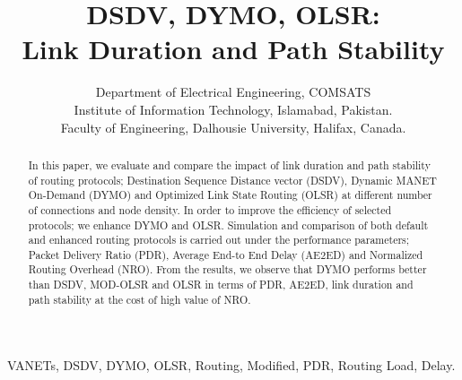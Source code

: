 \documentclass[journal]{IEEEtran}
\begin{document}
\title{DSDV, DYMO, OLSR:\\ Link Duration and Path Stability}


\author{
                Department of Electrical Engineering, COMSATS\\ Institute of
                Information Technology, Islamabad, Pakistan. \\
                Faculty of Engineering, Dalhousie University, Halifax, Canada.
             }



\maketitle

\begin{abstract}
In this paper, we evaluate and compare the impact of link duration and path stability of routing protocols; Destination Sequence Distance vector (DSDV), Dynamic MANET On-Demand (DYMO) and Optimized Link State Routing (OLSR) at different number of connections and node density. In order to improve the efficiency of selected protocols; we enhance DYMO and OLSR. Simulation and comparison of both default and enhanced routing protocols is carried out under the performance parameters; Packet Delivery Ratio (PDR), Average End-to End Delay (AE2ED) and Normalized Routing Overhead (NRO). From the results, we observe that DYMO performs better than DSDV, MOD-OLSR and OLSR in terms of PDR, AE2ED, link duration and path stability at the cost of high value of NRO.
\end{abstract}

\begin{IEEEkeywords}
VANETs, DSDV, DYMO, OLSR, Routing, Modified, PDR, Routing Load, Delay.
\end{IEEEkeywords}

\IEEEpeerreviewmaketitle
\end{document}
